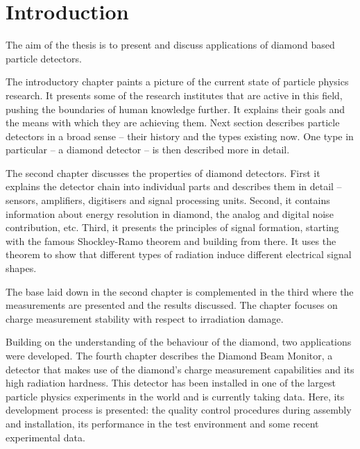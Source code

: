 
\chapter{Introduction}
\label{ch:intro}


The aim of the thesis is to present and discuss applications of diamond based particle detectors. 

The introductory chapter paints a picture of the current state of particle physics research. It presents some of the research institutes that are active in this field, pushing the boundaries of human knowledge further. It explains their goals and the means with which they are achieving them. Next section describes particle detectors in a broad sense -- their history and the types existing now. One type in particular -- a diamond detector -- is then described more in detail.

The second chapter discusses the properties of diamond detectors. First it explains the detector chain into individual parts and describes them in detail -- sensors, amplifiers, digitisers and signal processing units. Second, it contains information about energy resolution in diamond, the analog and digital noise contribution, etc. Third, it presents the principles of signal formation, starting with the famous Shockley-Ramo theorem and building from there. It uses the theorem to show that different types of radiation induce different electrical signal shapes.

The base laid down in the second chapter is complemented in the third where the measurements are presented and the results discussed. The chapter focuses on charge measurement stability with respect to irradiation damage.

Building on the understanding of the behaviour of the diamond, two applications were developed. The fourth chapter describes the Diamond Beam Monitor, a detector that makes use of the diamond's charge measurement capabilities and its high radiation hardness. This detector has been installed in one of the largest particle physics experiments in the world and is currently taking data. Here, its development process is presented: the quality control procedures during assembly and installation, its performance in the test environment and some recent experimental data.

